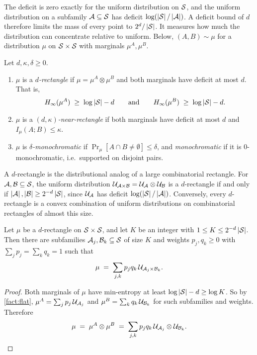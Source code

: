 \noindent The deficit is zero exactly for the uniform distribution on $\mathcal{S}$, and the uniform distribution on a subfamily $\mathcal{A} \subseteq \mathcal{S}$ has deficit $\log(\left|\mathcal{S}\right|/\left|\mathcal{A}\right|)$. A deficit bound of $d$ therefore limits the mass of every point to $2^d/\left|\mathcal{S}\right|$. It measures how much the distribution can concentrate relative to uniform. Below, $(A,B) \sim \mu$ for a distribution $\mu$ on $\mathcal{S} \times \mathcal{S}$ with marginals $\mu^A, \mu^B$.

\begin{definition}\label{def:rect}
Let $d, \kappa, \delta \ge 0$.
\begin{enumerate}[label=(\alph*)]
  \item $\mu$ is a \emph{$d$-rectangle} if $\mu = \mu^A \otimes \mu^B$ and both marginals have deficit at most $d$. That is,
  \begin{align*}
      H_\infty(\mu^A) \;\ge\; \log\left|\mathcal{S}\right| - d \qquad\text{and}\qquad H_\infty(\mu^B) \;\ge\; \log\left|\mathcal{S}\right| - d.
  \end{align*}
  \item $\mu$ is a \emph{$(d,\kappa)$-near-rectangle} if both marginals have deficit at most $d$ and $I_\mu(A;B) \le \kappa$.
  \item $\mu$ is \emph{$\delta$-monochromatic} if $\Pr_\mu[A \cap B \ne \emptyset] \le \delta$, and \emph{monochromatic} if it is $0$-monochromatic, i.e.\ supported on disjoint pairs.
\end{enumerate}
\end{definition}

\noindent A $d$-rectangle is the distributional analog of a large combinatorial rectangle. For $\mathcal{A}, \mathcal{B} \subseteq \mathcal{S}$, the uniform distribution $\mathcal{U}_{\mathcal{A} \times \mathcal{B}} = \mathcal{U}_{\mathcal{A}} \otimes \mathcal{U}_{\mathcal{B}}$ is a $d$-rectangle if and only if $\left|\mathcal{A}\right|, \left|\mathcal{B}\right| \ge 2^{-d}\left|\mathcal{S}\right|$, since $\mathcal{U}_{\mathcal{A}}$ has deficit $\log(\left|\mathcal{S}\right|/\left|\mathcal{A}\right|)$. Conversely, every $d$-rectangle is a convex combination of uniform distributions on combinatorial rectangles of almost this size.

\begin{corollary}\label{cor:flat-rect}
Let $\mu$ be a $d$-rectangle on $\mathcal{S} \times \mathcal{S}$, and let $K$ be an integer with $1 \le K \le 2^{-d}\left|\mathcal{S}\right|$. Then there are subfamilies $\mathcal{A}_j, \mathcal{B}_k \subseteq \mathcal{S}$ of size $K$ and weights $p_j, q_k \ge 0$ with $\sum_j p_j = \sum_k q_k = 1$ such that
\[ \mu \;=\; \sum_{j,k} p_j q_k\, \mathcal{U}_{\mathcal{A}_j \times \mathcal{B}_k}. \]
\end{corollary}
\begin{proof}
Both marginals of $\mu$ have min-entropy at least $\log\left|\mathcal{S}\right| - d \ge \log K$. So by \cref{fact:flat}, $\mu^A = \sum_j p_j\, \mathcal{U}_{\mathcal{A}_j}$ and $\mu^B = \sum_k q_k\, \mathcal{U}_{\mathcal{B}_k}$ for such subfamilies and weights. Therefore
\[ \mu \;=\; \mu^A \otimes \mu^B \;=\; \sum_{j,k} p_j q_k\, \mathcal{U}_{\mathcal{A}_j} \otimes \mathcal{U}_{\mathcal{B}_k}. \qedhere \]
\end{proof}

